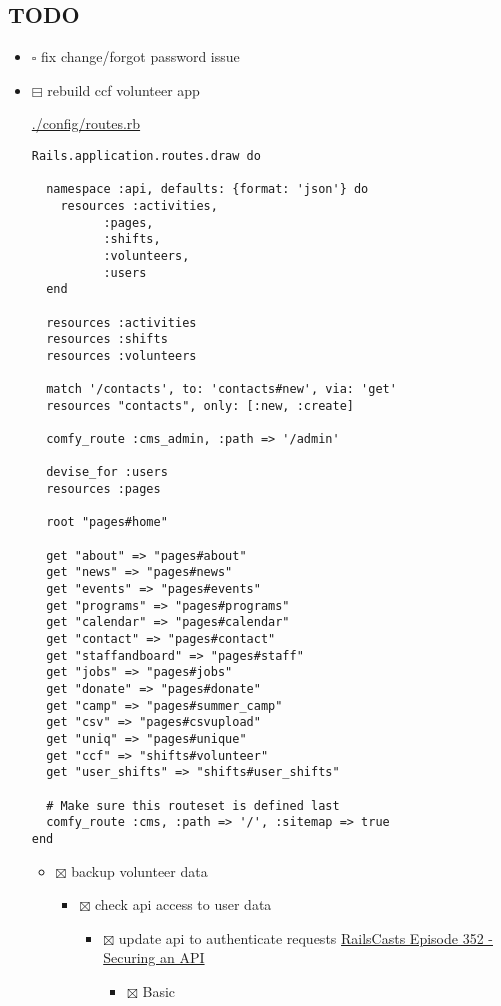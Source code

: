 \documentclass[11pt]{article}
\begin{document}
\subsection*{{\bfseries\sffamily TODO} }
\label{sec-1-1}
\begin{itemize}
\item $\square$ fix change/forgot password issue
\item $\boxminus$ rebuild ccf volunteer app

\url{./config/routes.rb}

\begin{verbatim}
Rails.application.routes.draw do

  namespace :api, defaults: {format: 'json'} do
    resources :activities,
	      :pages,
	      :shifts,
	      :volunteers,
	      :users
  end

  resources :activities
  resources :shifts 
  resources :volunteers

  match '/contacts', to: 'contacts#new', via: 'get'
  resources "contacts", only: [:new, :create]

  comfy_route :cms_admin, :path => '/admin'

  devise_for :users
  resources :pages

  root "pages#home"

  get "about" => "pages#about"
  get "news" => "pages#news"
  get "events" => "pages#events"
  get "programs" => "pages#programs"
  get "calendar" => "pages#calendar"
  get "contact" => "pages#contact"
  get "staffandboard" => "pages#staff"
  get "jobs" => "pages#jobs"
  get "donate" => "pages#donate"
  get "camp" => "pages#summer_camp"
  get "csv" => "pages#csvupload"
  get "uniq" => "pages#unique"
  get "ccf" => "shifts#volunteer"
  get "user_shifts" => "shifts#user_shifts"

  # Make sure this routeset is defined last
  comfy_route :cms, :path => '/', :sitemap => true
end
\end{verbatim}

\begin{itemize}
\item $\boxtimes$ backup volunteer data
\begin{itemize}
\item $\boxtimes$ check api access to user data
\begin{itemize}
\item $\boxtimes$ update api to authenticate requests
\href{http://railscasts.com/episodes/352-securing-an-api?view%3Dasciicast}{RailsCasts Episode 352 - Securing an API}
\begin{itemize}
\item $\boxtimes$ Basic


\end{itemize}
\end{itemize}
\end{itemize}
\end{itemize}
\end{itemize}
\end{document}
